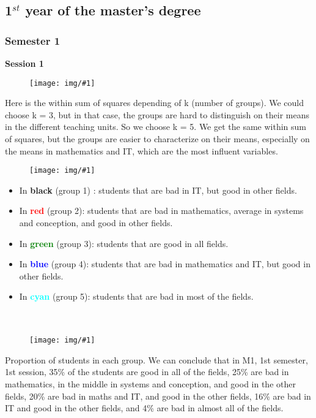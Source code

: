 \documentclass[11pt, a4paper]{article}
\newcommand\image[2]{
	\begin{figure}[H]
	\centering
	\texttt{[image: img/\#1]}
	\end{figure}
}
\begin{document}
    \newpage

    \subsection{1$^{st}$ year of the master's degree}

    \subsubsection{Semester 1}

    \textbf{\large{Session 1}}

    \image{image11.png}{200px}

    Here is the within sum of squares depending of k (number of groups). We could choose k = 3, but in that case, the groups are hard to distinguish on their means in the different teaching units. So we choose k = 5. We get the same within sum of squares, but the groups are easier to characterize on their means, especially on the means in mathematics and IT, which are the most influent variables.

    \image{image12.png}{480px}

    \begin{multicols}{2}
        \begin{itemize}
            \item In \textbf{black} (group 1) : students that are bad in IT, but good in other fields. 
            \item In \textbf{\textcolor{red}{red}} (group 2): students that are bad in mathematics, average in systems and conception, and good in other fields.
            \item In \textbf{\textcolor{green}{green}} (group 3): students that are good in all fields.
            \item In \textbf{\textcolor{blue}{blue}} (group 4): students that are bad in mathematics and IT, but good in other fields.
            \item In \textbf{\textcolor{cyan}{cyan}} (group 5): students that are bad in most of the fields.\\\\\\ 
        \end{itemize}
    \end{multicols}

    \newpage

    \image{image09.png}{380px}
    
    Proportion of students in each group.
    We can conclude that in M1, 1st semester, 1st session, 35\% of the students are good in all of the fields, 25\% are bad in mathematics, in the middle in systems and conception, and good in the other fields, 20\% are bad in maths and IT, and good in the other fields, 16\% are bad in IT and good in the other fields, and 4\% are bad in almost all of the fields.
\end{document}
